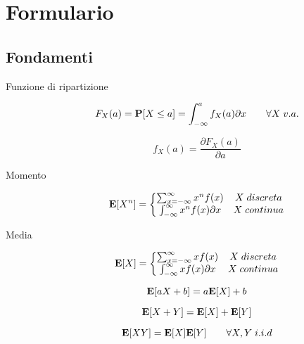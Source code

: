 \clearpage
\section{Formulario}
\label{sec:formulary}

\subsection{Fondamenti}

\begin{description}
	
	\item [Funzione di ripartizione]
		\begin{equation}
		F_{X}(a) = \mathbf{P}[X \leq a] = \int_{-\infty}^{a} f_{X}(a) \partial x \qquad\forall X \; v.a.
		\end{equation}
		
		\begin{equation}
		f_{X}(a) = \frac{\partial F_{X}(a)}{\partial a}
		\end{equation}
		
	\item [Momento]	
		\begin{equation}
		\mathbf{E}[X^{n}] = \left\{\begin{matrix}
		\sum_{x=-\infty}^{\infty} x^{n} f(x) & X \; discreta \\
		\int_{-\infty}^{\infty} x^{n} f(x) \partial x & X \; continua
		\end{matrix}\right.
		\end{equation}
	
	\item [Media]
		\begin{equation}
		\mathbf{E}[X] = \left\{\begin{matrix}
		\sum_{x=-\infty}^{\infty} xf(x) & X \; discreta \\
		\int_{-\infty}^{\infty} x f(x) \partial x & X \; continua
		\end{matrix}\right.
		\end{equation}
	
		\begin{equation}
		\mathbf{E}[aX+b] = a \mathbf{E}[X] + b
		\end{equation}
		
		\begin{equation}
		\mathbf{E}[X+Y] = \mathbf{E}[X] + \mathbf{E}[Y]
		\end{equation}
		
		\begin{equation}
		\mathbf{E}[XY] = \mathbf{E}[X] \mathbf{E}[Y] \qquad\forall X,Y \; i.i.d
		\end{equation}
		

\end{description}
